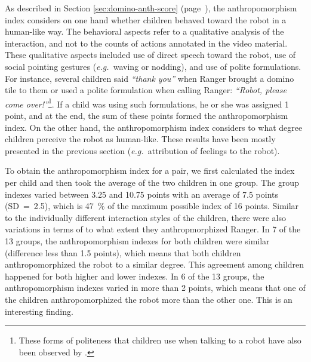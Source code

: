 \documentclass{sig-alternate}
\newcommand{\eg}{{\textit{e.g.~}}}
\begin{document}
As described in Section \ref{sec:domino-anth-score}
(page~\pageref{sec:domino-anth-score}), the anthropomorphism index considers on
one hand whether children behaved toward the robot in a human-like way. The
behavioral aspects refer to a qualitative analysis of the interaction, and not
to the counts of actions annotated in the video material. These qualitative
aspects included use of direct speech toward the robot, use of social pointing
gestures (\eg waving or nodding), and use of polite formulations. For instance,
several children said \textit{``thank you''} when Ranger brought a domino tile
to them or used a polite formulation when calling Ranger: \textit{``Robot,
please come over!''}\footnote{These forms of politeness that children use when
talking to a robot have also been observed by \cite{leite_long-term_2013}.}. If
a child was using such formulations, he or she was assigned 1 point, and at the
end, the sum of these points formed the anthropomorphism index. On the other
hand, the anthropomorphism index considers to what degree children perceive the
robot as human-like. These results have been mostly presented in the previous
section (\eg attribution of feelings to the robot). 

To obtain the anthropomorphism index for a pair, we first calculated the index
per child and then took the average of the two children in one group.  The group
indexes varied between 3.25 and 10.75 points with an average of 7.5 points
(SD~=~2.5), which is 47~\% of the maximum possible index of 16 points. Similar
to the individually different interaction styles of the children, there were
also variations in terms of to what extent they anthropmorphized Ranger. In 7 of
the 13 groups, the anthropomorphism indexes for both children were similar
(difference less than 1.5 points), which means that both children
anthropomorphized the robot to a similar degree. This agreement among children
happened for both higher and lower indexes. In 6 of the 13 groups, the
anthropomorphism indexes varied in more than 2 points, which means that one of
the children anthropomorphized the robot more than the other one. This is an
interesting finding.
\end{document}
